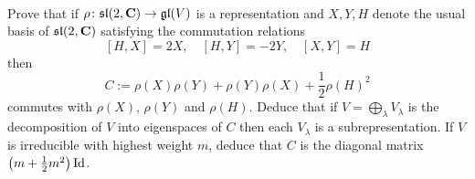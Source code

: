 \documentclass[12pt]{article}
\begin{document}
\begin{question}\ \\
Prove that if $\rho\colon\mathfrak{sl}(2,\mathbf{C})\to\mathfrak{gl}(V)$ is a representation and $X,Y,H$ denote the usual basis of $\mk{sl}(2,\CC)$ satisfying the commutation relations
\[[H,X]=2X,\quad [H,Y]=-2Y,\quad [X,Y]=H\]
then
\[C:=\rho(X)\rho(Y)+\rho(Y)\rho(X)+\frac{1}{2}\rho(H)^2\]
commutes with $\rho(X)$, $\rho(Y)$ and $\rho(H)$. Deduce that if $V=\bigoplus_{\lambda}V_{\lambda}$ is the decomposition of $V$ into eigenspaces of $C$ then each $V_{\lambda}$ is a subrepresentation. If $V$ is irreducible with highest weight $m$, deduce that $C$ is the diagonal matrix $\left(m+\frac{1}{2}m^2\right)\operatorname{Id}$.
\end{question}

\iffalse
\begin{answer}
In the solution we will write $X$ for $\rho(X)$, etc. and the fact that $\rho$ is a homomorphism of Lie algebras means that $[X,Y]$ means both $[\rho(X),\rho(Y)]$ and $\rho([X,Y])$ so the notation is well-defined! We have
\begin{align*}
      CX      &=(XY+YX+H^2/2)X\\
              &=XYX+YXX+HHX/2\\
              &=XYX+[Y,X]X+XYX+H[H,X]/2+HXH/2\\
              &=XYX-HX+X[Y,X]+XXY+HX+[H,X]H/2+XHH/2\\
              &=XYX-HX-XH+XXY+HX+XH+XHH/2\\
              &=X(XY+YX+H^2/2)\\
              &=XC.
\end{align*}
Similar arguments work for $Y$ and $H$.

Now since $C$ commutes with $\rho(X)$, if $Cv=\lambda v$ then
\[C\rho(X)v=\rho(X)Cv=\rho(X)\lambda v=\lambda\rho(X)v\]
so $V_{\lambda}$ is preserved by $\rho(X)$ (and $\rho(Y),\rho(H)$ by the same argument). Therefore it is a subrepresentation.

If $V$ is irreducible then $V=V_{\lambda}$ for some eigenvalue $\lambda$ and hence $Cv=\lambda v$ for all $v\in V$. To compute $\lambda$, assume that $v$ is a highest weight vector with weight $m$. Then $\rho(X)v=0$, $\rho(H)v=mv$ and $\rho(Y)v$ satisfies
\[\rho(X)\rho(Y)v=mv,\ \rho(H)\rho(Y)v=(m-2)\rho(Y)v\]
by the computations we did in the proof of the classification theorem for irreducible $\mk{sl}(2,\CC)$-representations. Therefore
\[Cv=\rho(X)\rho(Y)v+\rho(Y)\rho(X)v+\frac{1}{2}\rho(H)^2v=mv+m^2v/2\]
and $\lambda=m+m^2/2$ as required.
\end{answer}
\fi
\end{document}
